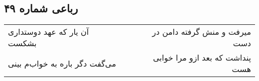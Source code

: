 \begin{center}
\section*{رباعی شماره ۴۹}
\label{sec:sh049}
\begin{longtable}{l p{0.5cm} r}
آن یار که عهد دوستداری بشکست
&&
میرفت و منش گرفته دامن در دست
\\
می‌گفت دگر باره به خواب‌م بینی
&&
پنداشت که بعد ازو مرا خوابی هست
\\
\end{longtable}
\end{center}
